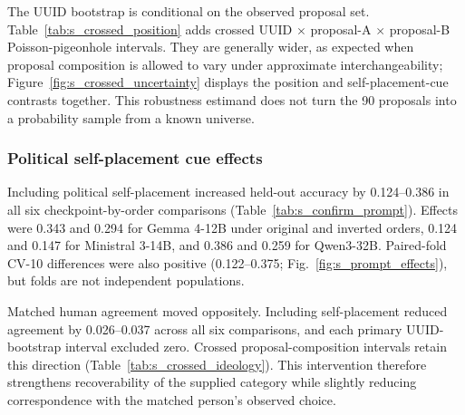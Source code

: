 \documentclass[unnumsec,webpdf,modern,large]{oup-authoring-template}
\begin{document}
The UUID bootstrap is conditional on the observed proposal set. Table~\ref{tab:s_crossed_position} adds crossed UUID $\times$ proposal-A $\times$ proposal-B Poisson-pigeonhole intervals. They are generally wider, as expected when proposal composition is allowed to vary under approximate interchangeability; Figure~\ref{fig:s_crossed_uncertainty} displays the position and self-placement-cue contrasts together. This robustness estimand does not turn the 90 proposals into a probability sample from a known universe.

\begin{table}[t]
\caption{Decoded A/B-order stability with fixed-proposal UUID-only and proposal-composition crossed intervals. Crossed intervals use Poisson-pigeonhole UUID $\times$ proposal-A $\times$ proposal-B weights.}
\label{tab:s_crossed_position}
\centering
\small

\end{table}

\subsubsection{Political self-placement cue effects}

Including political self-placement increased held-out accuracy by 0.124--0.386 in all six checkpoint-by-order comparisons (Table~\ref{tab:s_confirm_prompt}). Effects were 0.343 and 0.294 for Gemma 4-12B under original and inverted orders, 0.124 and 0.147 for Ministral 3-14B, and 0.386 and 0.259 for Qwen3-32B. Paired-fold CV-10 differences were also positive (0.122--0.375; Fig.~\ref{fig:s_prompt_effects}), but folds are not independent populations.

Matched human agreement moved oppositely. Including self-placement reduced agreement by 0.026--0.037 across all six comparisons, and each primary UUID-bootstrap interval excluded zero. Crossed proposal-composition intervals retain this direction (Table~\ref{tab:s_crossed_ideology}). This intervention therefore strengthens recoverability of the supplied category while slightly reducing correspondence with the matched person's observed choice.

\begin{table}[t]
\caption{Effects of including political self-placement, computed as present minus ablated within each checkpoint and A/B order. Classification intervals pair held-out test UUIDs; human-agreement intervals resample paired UUID histories.}
\label{tab:s_confirm_prompt}
\centering
\small

\end{table}
\end{document}
